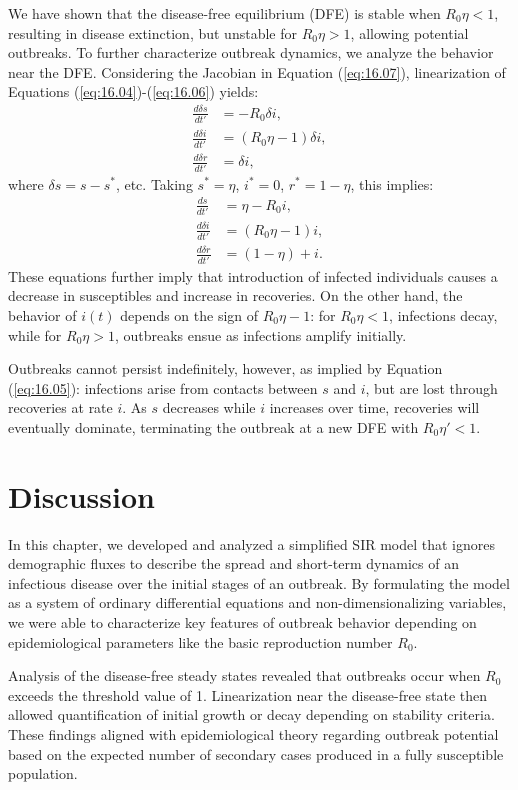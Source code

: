 We have shown that the disease-free equilibrium (DFE) is stable when $R_0\eta<1$, resulting in disease extinction, but unstable for $R_0\eta>1$, allowing potential outbreaks. To further characterize outbreak dynamics, we analyze the behavior near the DFE. Considering the Jacobian in Equation (\ref{eq:16.07}), linearization of Equations (\ref{eq:16.04})-(\ref{eq:16.06}) yields:
\begin{align*}
\frac{d\delta s}{dt'} &= -R_0 \delta i, \\
\frac{d\delta i}{dt'} &= (R_0\eta-1)\delta i, \\
\frac{d\delta r}{dt'} &= \delta i,
\end{align*}
where $\delta s=s-s^*$, etc. Taking $s^*=\eta$, $i^*=0$, $r^*=1-\eta$, this implies:
\begin{align*}
\frac{ds}{dt'} &= \eta - R_0i, \\
\frac{d\delta i}{dt'} &= (R_0\eta-1)i, \\
\frac{d\delta r}{dt'} &= (1-\eta)+i.
\end{align*}
These equations further imply that introduction of infected individuals causes a decrease in susceptibles and increase in recoveries. On the other hand, the behavior of $i(t)$ depends on the sign of $R_0\eta-1$: for $R_0\eta<1$, infections decay, while for $R_0\eta>1$, outbreaks ensue as infections amplify initially.

Outbreaks cannot persist indefinitely, however, as implied by Equation (\ref{eq:16.05}): infections arise from contacts between $s$ and $i$, but are lost through recoveries at rate $i$. As $s$ decreases while $i$ increases over time, recoveries will eventually dominate, terminating the outbreak at a new DFE with $R_0\eta'<1$.

\section{Discussion}

In this chapter, we developed and analyzed a simplified SIR model that ignores demographic fluxes to describe the spread and short-term dynamics of an infectious disease over the initial stages of an outbreak. By formulating the model as a system of ordinary differential equations and non-dimensionalizing variables, we were able to characterize key features of outbreak behavior depending on epidemiological parameters like the basic reproduction number $R_0$.

Analysis of the disease-free steady states revealed that outbreaks occur when $R_0$ exceeds the threshold value of 1. Linearization near the disease-free state then allowed quantification of initial growth or decay depending on stability criteria. These findings aligned with epidemiological theory regarding outbreak potential based on the expected number of secondary cases produced in a fully susceptible population.


